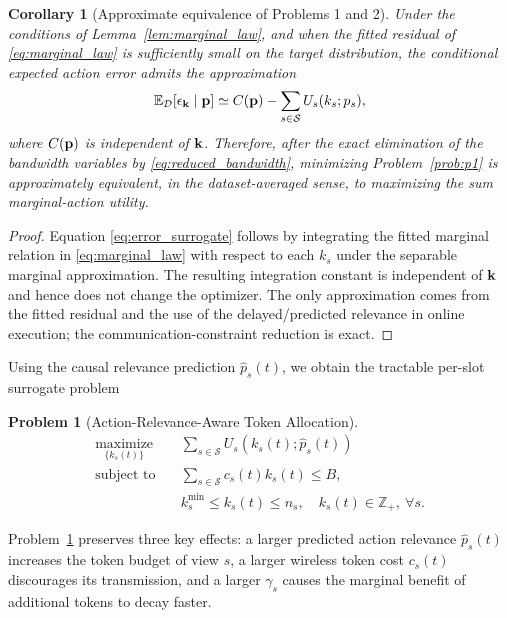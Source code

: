 \documentclass[lettersize,journal]{IEEEtran}
\theoremstyle{custom}
\newtheorem{Cor}{Corollary}
\newtheorem{Prob}{Problem}
\begin{document}
\begin{Cor}[Approximate equivalence of Problems 1 and 2]\label{cor:equivalence}
Under the conditions of Lemma~\ref{lem:marginal_law}, and when the fitted residual of \eqref{eq:marginal_law} is sufficiently small on the target distribution, the conditional expected action error admits the approximation
\begin{align}\label{eq:error_surrogate}
    \mathbb E_{\mathcal D}[\epsilon_{\bf k}\mid{\bf p}]
    \simeq C({\bf p})-\sum_{s\in\mathcal S}U_s(k_s;p_s),
\end{align}
where $C({\bf p})$ is independent of ${\bf k}$. Therefore, after the exact elimination of the bandwidth variables by \eqref{eq:reduced_bandwidth}, minimizing Problem~\ref{prob:p1} is approximately equivalent, in the dataset-averaged sense, to maximizing the sum marginal-action utility.
\end{Cor}
\begin{proof}
Equation \eqref{eq:error_surrogate} follows by integrating the fitted marginal relation in \eqref{eq:marginal_law} with respect to each $k_s$ under the separable marginal approximation. The resulting integration constant is independent of ${\bf k}$ and hence does not change the optimizer. The only approximation comes from the fitted residual and the use of the delayed/predicted relevance in online execution; the communication-constraint reduction is exact.
\end{proof}

Using the causal relevance prediction $\widehat p_s(t)$, we obtain the tractable per-slot surrogate problem
\begin{Prob}[Action-Relevance-Aware Token Allocation]\label{prob:p2}
\begin{align}
    \underset{\{k_s(t)\}}{\textrm{maximize}}\quad
    & \sum_{s\in\mathcal S}U_s\!\left(k_s(t);\widehat p_s(t)\right) \label{eq:p2obj}\\
    \textrm{subject to}\quad
    & \sum_{s\in\mathcal S}c_s(t)k_s(t)\leq B, \nonumber\\
    & k_s^{\min}\leq k_s(t)\leq n_s,\quad k_s(t)\in\mathbb Z_+,\ \forall s. \nonumber
\end{align}
\end{Prob}
Problem~\ref{prob:p2} preserves three key effects: a larger predicted action relevance $\widehat p_s(t)$ increases the token budget of view $s$, a larger wireless token cost $c_s(t)$ discourages its transmission, and a larger $\gamma_s$ causes the marginal benefit of additional tokens to decay faster.
\end{document}
